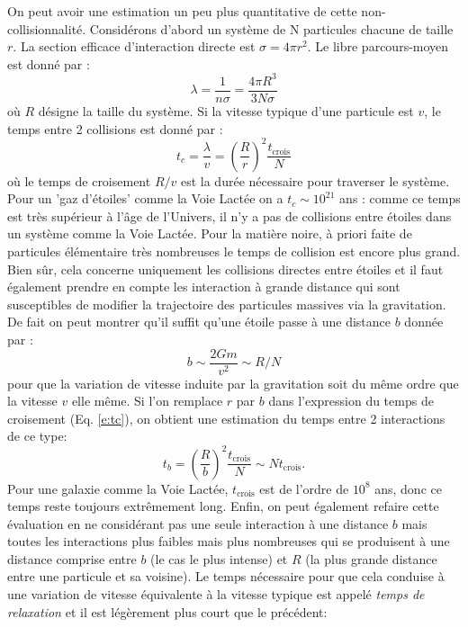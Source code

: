 On peut avoir une estimation un peu plus quantitative de cette non-collisionnalité. Considérons d'abord un système de N particules chacune de taille $r$. La section efficace d'interaction directe est $\sigma=4\pi r^2$. Le libre parcours-moyen est donné par :
\begin{equation}
\lambda=\frac{1}{n\sigma}=\frac{4\pi R^3}{3 N \sigma}
\end{equation}
où $R$ désigne la taille du système. Si la vitesse typique d'une particule est $v$, le temps entre 2 collisions est donné par :
\begin{equation}
t_c=\frac{\lambda}{v}=\left(\frac{R}{r}\right)^2 \frac{t_\mathrm{crois}}{N}
\label{e:tc}
\end{equation}
où le temps de croisement $R/v$ est la durée nécessaire pour traverser le système. Pour un 'gaz d'étoiles' comme la Voie Lactée on a $t_c\sim 10^{21}$ ans : comme ce temps est très supérieur à l'âge de l'Univers, il n'y a pas de collisions entre étoiles dans un système comme la Voie Lactée. Pour la matière noire, à priori faite de particules élémentaire très nombreuses le temps de collision est encore plus grand.
Bien sûr, cela concerne uniquement les collisions directes entre étoiles et il faut également prendre en compte les interaction à grande distance qui sont susceptibles de modifier la trajectoire des particules massives via la gravitation. De fait on peut montrer qu'il suffit qu'une étoile passe à une distance $b$ donnée par :
\begin{equation}
b\sim\frac{2Gm}{v^2}\sim R/N
\end{equation}
pour que la variation de vitesse induite par la gravitation soit du même ordre que la vitesse $v$ elle même. Si l'on remplace $r$ par $b$ dans l'expression du temps de croisement (Eq. \ref{e:tc}), on obtient une estimation du temps entre 2 interactions de ce type:
\begin{equation}
t_b=\left(\frac{R}{b}\right)^2 \frac{t_\mathrm{crois}}{N}\sim N t_\mathrm{crois}.
\end{equation}
Pour une galaxie comme la Voie Lactée, $t_\mathrm{crois}$ est de l'ordre de $10^8$ ans, donc ce temps reste toujours extrêmement long. Enfin, on peut également refaire cette évaluation en ne considérant pas une seule interaction à une distance $b$ mais toutes les interactions plus faibles mais plus nombreuses qui se produisent à une distance comprise entre $b$ (le cas le plus intense) et $R$ (la plus grande distance entre une particule et sa voisine). Le temps nécessaire pour que cela conduise à une variation de vitesse équivalente à la vitesse typique est appelé \textit{temps de relaxation} et il est légèrement plus court que le précédent:
